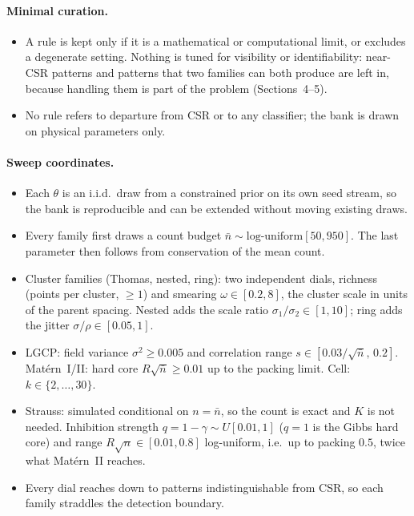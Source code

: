 \documentclass[twoside]{article}
\newcommand{\nb}{\bar n}
\begin{document}
\paragraph{Minimal curation.}
\begin{itemize}
  \item A rule is kept only if it is a mathematical or computational limit, or excludes a degenerate setting.
        Nothing is tuned for visibility or identifiability: near-CSR patterns and patterns that two families can
        both produce are left in, because handling them is part of the problem (Sections~4--5).
  \item No rule refers to departure from CSR or to any classifier; the bank is drawn on physical parameters only.
\end{itemize}

\paragraph{Sweep coordinates.}
\begin{itemize}
  \item Each $\theta$ is an i.i.d.\ draw from a constrained prior on its own seed stream, so the bank is
        reproducible and can be extended without moving existing draws.
  \item Every family first draws a count budget $\nb\sim\text{log-uniform}[50,950]$. The last parameter then
        follows from conservation of the mean count.
  \item Cluster families (Thomas, nested, ring): two independent dials, richness (points per cluster, $\ge1$) and
        smearing $\omega\in[0.2,8]$, the cluster scale in units of the parent spacing. Nested adds the scale ratio
        $\sigma_1/\sigma_2\in[1,10]$; ring adds the jitter $\sigma/\rho\in[0.05,1]$.
  \item LGCP: field variance $\sigma^2\ge0.005$ and correlation range $s\in[0.03/\sqrt{\nb},\,0.2]$. Mat\'ern~I/II:
        hard core $R\sqrt{\nb}\ge0.01$ up to the packing limit. Cell: $k\in\{2,\dots,30\}$.
  \item Strauss: simulated conditional on $n=\nb$, so the count is exact and $K$ is not needed. Inhibition
        strength $q=1-\gamma\sim U[0.01,1]$ ($q=1$ is the Gibbs hard core) and range $R\sqrt{n}\in[0.01,0.8]$
        log-uniform, i.e.\ up to packing $0.5$, twice what Mat\'ern~II reaches.
  \item Every dial reaches down to patterns indistinguishable from CSR, so each family straddles the detection
        boundary.
\end{itemize}
\end{document}
